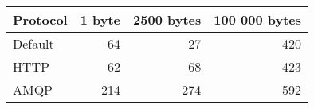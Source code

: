\begin{tabular}{lrrr}
\hline
 Protocol   &   1 byte &   2500 bytes &   100 000 bytes \\
\hline
 Default    &       64 &           27 &             420 \\
 HTTP       &       62 &           68 &             423 \\
 AMQP       &      214 &          274 &             592 \\
\hline
\end{tabular}